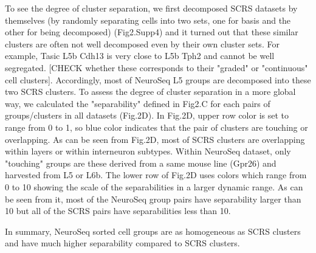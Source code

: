To see the degree of cluster separation, we first decomposed SCRS datasets by themselves (by randomly separating cells into two sets, one for basis and the other for being decomposed) (Fig2.Supp4) and it turned out that these similar clusters are often not well decomposed even by their own cluster sets. For example, Tasic L5b Cdh13 is very close to L5b Tph2 and cannot be well segregated. [CHECK whether these corresponds to their "graded" or "continuous" cell clusters]. Accordingly, most of NeuroSeq L5 groups are decomposed into these two SCRS clusters. 
To assess the degree of cluster separation in a more global way, we calculated the "separability" defined in Fig2.C for each pairs of groups/clusters in all datasets (Fig.2D). In Fig.2D, upper row color is set to range from 0 to 1, so blue color indicates that the pair of clusters are touching or overlapping. As can be seen from Fig.2D, most of SCRS clusters are overlapping within layers or within interneuron subtypes. Within NeuroSeq dataset, only "touching" groups are these derived from a same mouse line (Gpr26) and harvested from L5 or L6b.  The lower row of Fig.2D uses colors which range from 0 to 10 showing the scale of the separabilities in a larger dynamic range. As can be seen from it, most of the NeuroSeq group pairs have separability larger than 10 but all of the SCRS pairs have separabilities less than 10.

In summary, NeuroSeq sorted cell groups are as homogeneous as SCRS clusters and have much higher separability compared to SCRS clusters. 









